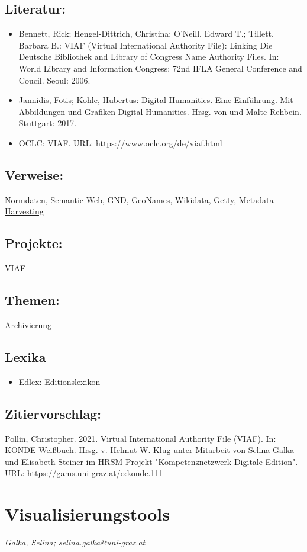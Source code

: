 \documentclass{article}
\begin{document}
        \subsection*{Literatur:}\begin{itemize}\item Bennett, Rick; Hengel-Dittrich, Christina; O’Neill, Edward T.; Tillett, Barbara B.: VIAF (Virtual International Authority File): Linking Die Deutsche Bibliothek and Library of Congress Name Authority Files. In: World Library and Information Congress: 72nd IFLA General Conference and Coucil. Seoul: 2006.\item Jannidis, Fotis; Kohle, Hubertus: Digital Humanities. Eine Einführung. Mit Abbildungen und Grafiken Digital Humanities. Hrsg. von  und Malte Rehbein. Stuttgart: 2017.\item OCLC: VIAF. URL: \url{https://www.oclc.org/de/viaf.html}\end{itemize}\subsection*{Verweise:}\href{https://gams.uni-graz.at/o:konde.147}{Normdaten}, \href{https://gams.uni-graz.at/o:konde.167}{Semantic Web}, \href{https://gams.uni-graz.at/o:konde.109}{GND}, \href{https://gams.uni-graz.at/o:konde.107}{GeoNames}, \href{https://gams.uni-graz.at/o:konde.112}{Wikidata}, \href{https://gams.uni-graz.at/o:konde.108}{Getty}, \href{https://gams.uni-graz.at/o:konde.10}{Metadata Harvesting}\subsection*{Projekte:}\href{https://viaf.org}{VIAF}\subsection*{Themen:}Archivierung\subsection*{Lexika}\begin{itemize}\item \href{https://edlex.de/index.php?title=Virtual_International_Authority_File_(VIAF)}{Edlex: Editionslexikon}\end{itemize}\subsection*{Zitiervorschlag:}Pollin, Christopher. 2021. Virtual International Authority File (VIAF). In: KONDE Weißbuch. Hrsg. v. Helmut W. Klug unter Mitarbeit von Selina Galka und Elisabeth Steiner im HRSM Projekt "Kompetenznetzwerk Digitale Edition". URL: https://gams.uni-graz.at/o:konde.111\newpage\section*{Visualisierungstools} \emph{Galka, Selina; selina.galka@uni-graz.at}\\
        
\end{document}
